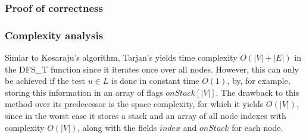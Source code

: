 \subsubsection{Proof of correctness}

\subsubsection{Complexity analysis}
Simlar to Kosaraju's algorithm, Tarjan's yields time complexity $O(|V|+|E|)$ in the DFS\_T function since it iterates once over all nodes. However, this can only be achieved if the test $u \in L$ is done in constant time $O(1)$, by, for example, storing this information in an array of flags $onStack[|V|]$.
The drawback to this method over its predecessor is the space complexity, for which it yields $O(|V|)$, since in the worst case it stores a stack and an array of all node indexes with complexity $O(|V|)$, along with the fields $index$ and $onStack$ for each node. 